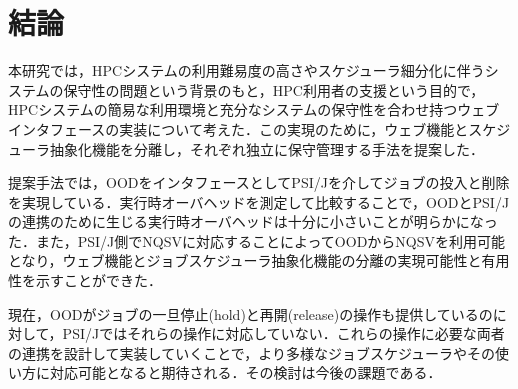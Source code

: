 \documentclass[a4paper,oneside,twocolumn,notitlepage,dvipdfmx]{jsarticle}
\begin{document}
\section{結論}
本研究では，HPCシステムの利用難易度の高さやスケジューラ細分化に伴うシステムの保守性の問題という背景のもと，HPC利用者の支援という目的で，HPCシステムの簡易な利用環境と充分なシステムの保守性を合わせ持つウェブインタフェースの実装について考えた．この実現のために，ウェブ機能とスケジューラ抽象化機能を分離し，それぞれ独立に保守管理する手法を提案した．\par
提案手法では，OODをインタフェースとしてPSI/Jを介してジョブの投入と削除を実現している．実行時オーバヘッドを測定して比較することで，OODとPSI/Jの連携のために生じる実行時オーバヘッドは十分に小さいことが明らかになった．また，PSI/J側でNQSVに対応することによってOODからNQSVを利用可能となり，ウェブ機能とジョブスケジューラ抽象化機能の分離の実現可能性と有用性を示すことができた．\par
現在，OODがジョブの一旦停止(hold)と再開(release)の操作も提供しているのに対して，PSI/Jではそれらの操作に対応していない．これらの操作に必要な両者の連携を設計して実装していくことで，より多様なジョブスケジューラやその使い方に対応可能となると期待される．その検討は今後の課題である．\par

\vspace{3\baselineskip}


\end{document}
